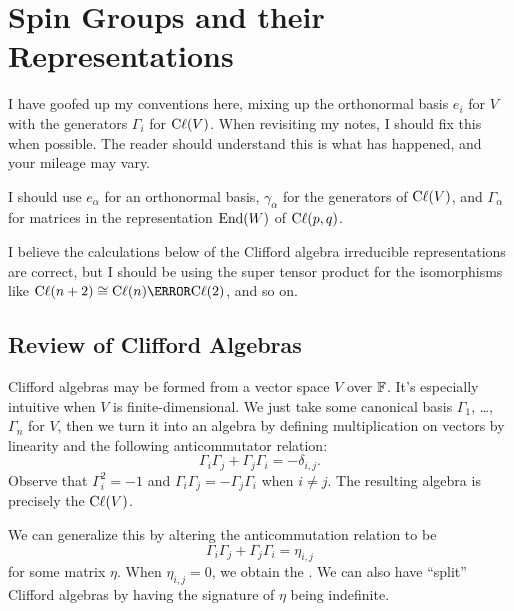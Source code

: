 \chapter{Spin Groups and their Representations}

\begin{ddanger}
I have goofed up my conventions here, mixing up the orthonormal basis
$e_{i}$ for $V$ with the generators $\Gamma_{i}$ for $\mathrm{C}\ell(V)$. When
revisiting my notes, I should fix this when possible. The reader should
understand this is what has happened, and your mileage may vary.
\end{ddanger}

I should use $e_{\alpha}$ for an orthonormal basis, $\gamma_{\alpha}$
for the generators of $\mathrm{C}\ell(V)$, and $\Gamma_{\alpha}$ for matrices in
the representation $\operatorname{End}(W)$ of $\mathrm{C}\ell(p,q)$.

I believe the calculations below of the Clifford algebra irreducible
representations are correct, but I should be using the super tensor
product for the isomorphisms like
$\Cl(n+2)\iso\Cl(n)\super\otimes\Cl(2)$, and so on.

\section{Review of Clifford Algebras}

\M
Clifford algebras may be formed from a vector space $V$ over $\mathbb{F}$. It's
especially intuitive when $V$ is finite-dimensional. We just take some
canonical basis $\Gamma_{1}$, \dots, $\Gamma_{n}$ for $V$, then we turn it into an
algebra by defining multiplication on vectors by linearity and the
following anticommutator relation:
\begin{equation}
\Gamma_{i}\Gamma_{j} + \Gamma_{j}\Gamma_{i} = -\delta_{i,j}.
\end{equation}
Observe that $\Gamma_{i}^{2}=-1$ and $\Gamma_{i}\Gamma_{j}=-\Gamma_{j}\Gamma_{i}$ when $i\neq j$.
The resulting algebra is precisely the  $\mathrm{C}\ell(V)$.

We can generalize this by altering the anticommutation relation to be
\begin{equation}
\Gamma_{i}\Gamma_{j} + \Gamma_{j}\Gamma_{i} = \eta_{i,j}
\end{equation}
for some matrix $\eta$. When $\eta_{i,j}=0$, we obtain the
. We can also have ``split'' Clifford algebras
by having the signature of $\eta$ being indefinite.

